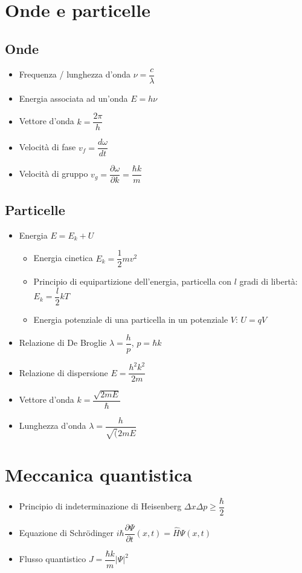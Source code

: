 \documentclass{article}
\begin{document}
\section{Onde e particelle}
\subsection{Onde}
\begin{itemize}
  \item Frequenza / lunghezza d'onda \( \nu = \dfrac{c}{\lambda} \)
  \item Energia associata ad un'onda \( E = h \nu \)
  \item Vettore d'onda \( k = \dfrac{2 \pi}{h} \)
  \item Velocità di fase \( v_f = \dfrac{d \omega}{d t}\)
  \item Velocità di gruppo \( v_g = \dfrac{\partial \omega}{\partial k} = \dfrac{\hbar k}{m} \)
\end{itemize}

\subsection{Particelle}
\begin{itemize}
  \item Energia \( E = E_k + U \)
        \begin{itemize}
          \item Energia cinetica \( E_k = \dfrac{1}{2} m v ^ 2 \)
          \item Principio di equipartizione dell'energia, particella con \( l \) gradi di libertà: \( E_k = \dfrac{l}{2} k T \)
          \item Energia potenziale di una particella in un potenziale \( V \): \( U = qV \)
        \end{itemize}
  \item Relazione di De Broglie \( \lambda = \dfrac{h}{p} \), \( p = \hbar k \)
  \item Relazione di dispersione \( E = \dfrac{h ^ 2 k ^ 2}{2 m} \)
  \item Vettore d'onda \( k = \dfrac{\sqrt{2mE}}{\hbar} \)
  \item Lunghezza d'onda \( \lambda = \dfrac{h}{\sqrt(2mE} \)
\end{itemize}

\section{Meccanica quantistica}
\begin{itemize}
  \item Principio di indeterminazione di Heisenberg \( \Delta x \Delta p \geq \dfrac{\hbar}{2} \)
  \item Equazione di Schrödinger \( i \hbar \dfrac{\partial \Psi}{\partial t} (x, t) = \hat{H} \Psi (x,t) \)
  \item Flusso quantistico \( J = \dfrac{\hbar k}{m} \left| \Psi \right| ^ 2 \)
\end{itemize}
\end{document}
